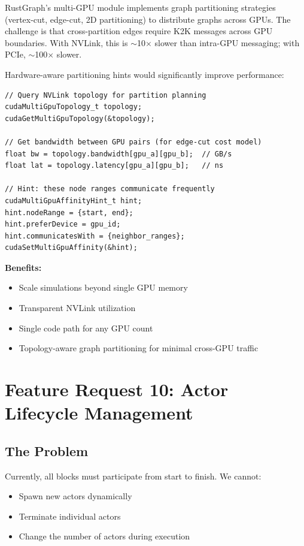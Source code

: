 \documentclass[11pt,a4paper]{article}
\newenvironment{benefitsbox}{%
    \vspace{6pt}%
    \noindent\textbf{Benefits:}%
    \begin{itemize}[leftmargin=1.5em,topsep=2pt,itemsep=1pt]%
}{%
    \end{itemize}%
    \vspace{6pt}%
}
\begin{document}
RustGraph's multi-GPU module implements graph partitioning strategies (vertex-cut, edge-cut, 2D partitioning) to distribute graphs across GPUs. The challenge is that cross-partition edges require K2K messages across GPU boundaries. With NVLink, this is $\sim$10$\times$ slower than intra-GPU messaging; with PCIe, $\sim$100$\times$ slower.

Hardware-aware partitioning hints would significantly improve performance:

\begin{lstlisting}[style=cstyle,title={Topology-aware graph partitioning}]
// Query NVLink topology for partition planning
cudaMultiGpuTopology_t topology;
cudaGetMultiGpuTopology(&topology);

// Get bandwidth between GPU pairs (for edge-cut cost model)
float bw = topology.bandwidth[gpu_a][gpu_b];  // GB/s
float lat = topology.latency[gpu_a][gpu_b];   // ns

// Hint: these node ranges communicate frequently
cudaMultiGpuAffinityHint_t hint;
hint.nodeRange = {start, end};
hint.preferDevice = gpu_id;
hint.communicatesWith = {neighbor_ranges};
cudaSetMultiGpuAffinity(&hint);
\end{lstlisting}

\begin{benefitsbox}
    \item Scale simulations beyond single GPU memory
    \item Transparent NVLink utilization
    \item Single code path for any GPU count
    \item Topology-aware graph partitioning for minimal cross-GPU traffic
\end{benefitsbox}

\newpage

\section{Feature Request 10: Actor Lifecycle Management}

\subsection{The Problem}

Currently, all blocks must participate from start to finish. We cannot:
\begin{itemize}[leftmargin=*]
    \item Spawn new actors dynamically
    \item Terminate individual actors
    \item Change the number of actors during execution
\end{itemize}
\end{document}
